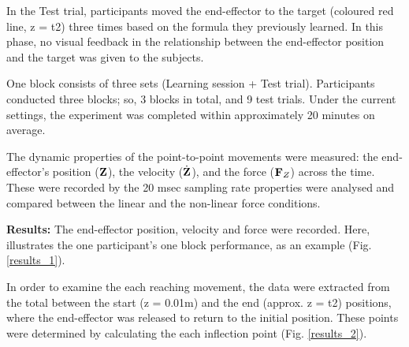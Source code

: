 In the Test trial, participants moved the end-effector to the target (coloured 
red line, z = t2) three times based on the formula they previously learned. In 
this phase, no visual feedback in the relationship between the end-effector 
position and the target was given to the subjects.

One block consists of three sets (Learning session + Test trial). Participants 
conducted three blocks; so, 3 blocks in total, and 9 test trials. Under the 
current settings, the experiment was completed within approximately 20 minutes 
on average.

The dynamic properties of the point-to-point movements were measured: the
end-effector's position ($\mathbf{Z}$), the velocity ($\dot{\mathbf{Z}}$), and the force
($\mathbf{F}_Z$) across the time. These were recorded by the 20 msec sampling rate
properties were analysed and compared between the linear and the non-linear
force conditions.






\textbf{Results:} The end-effector position, velocity and force were recorded. Here, illustrates
the one participant's one block performance, as an example (Fig. \ref{results_1}).

In order to examine the each reaching movement, the data were extracted from 
the total between the start (z = 0.01m) and the end (approx. z = t2) positions, 
where the end-effector was released to return to the initial position. These 
points were determined by calculating the each inflection point (Fig. \ref{results_2}).

